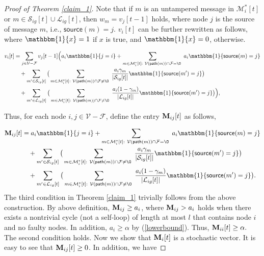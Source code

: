 \documentclass[letterpaper, 11pt]{article}
\newcommand{\calF}{{\mathcal{F}}}
\newcommand{\calL}{{\mathcal{L}}}
\newcommand{\calM}{{\mathcal{M}}}
\newcommand{\calS}{{\mathcal{S}}}
\newcommand{\calV}{{\mathcal{V}}}
\begin{document}
\begin{proof}[Proof of Theorem \ref{claim_1}]
Note that if $m$ is an untampered message in $\calM_i^*[t]$ or
$m\in \calS_{ig}[t]\cup \calL_{ig}[t]$, then $w_m=v_j[t-1]$ holds, where node $j$ is the source of message $m$, i.e., $\mathsf{source}(m)=j$. $v_i[t]$ can be further rewritten as follows, where $\mathbbm{1}\{x\}=1$ if $x$ is true, and $\mathbbm{1}\{x\}=0$, otherwise.


\begin{align*}
v_i[t]&=\sum_{j\in \calV-\calF}v_j[t-1]\Big{(} a_i\mathbbm{1}\{j=i\}+
\sum_{m\in \calM_i^*[t]:~ \calV(\mathsf{path}(m))\cap \calF=\O~}a_i\mathbbm{1}\{\mathsf{source}(m)=j\}\\
&\quad +\sum_{m^{\prime}\in \calS_{ig}[t]}\big{(}\sum_{m\in \calM_i^*[t]:~ \calV(\mathsf{path}(m))\cap \calF\not=\O~}
\frac{a_i\gamma_{m}}{|\calS_{ig}[t]|}\mathbbm{1}\{\mathsf{source}(m^{\prime})=j\}\big{)}\\
&\quad+
\sum_{m^{\prime}\in \calL_{ig}[t]}\big{(}\sum_{m\in \calM_i^*[t]:~\calV(\mathsf{path}(m))\cap \calF\not=\O~}\frac{a_i(1-\gamma_{m})}{|\calL_{ig}[t]|}\mathbbm{1}\{\mathsf{source}(m^{\prime})=j\}\big{)}\Big{)},
\end{align*}



Thus, for each node $i, j\in \calV-\calF$, define the entry ${\bf M}_{ij}[t]$ as follows,

\begin{align*}
      {\bf{M}}_{ij}[t]&=a_i\mathbbm{1}\{j=i\}+
\sum_{m\in \calM_i^*[t]:~ \calV(\mathsf{path}(m))\cap \calF=\O~}a_i\mathbbm{1}\{\mathsf{source}(m)=j\}\\
&\quad +\sum_{m^{\prime}\in \calS_{ig}[t]}\big{(}\sum_{m\in \calM_i^*[t]:~ \calV(\mathsf{path}(m))\cap \calF\not=\O~}
\frac{a_i\gamma_{m}}{|\calS_{ig}[t]|}\mathbbm{1}\{\mathsf{source}(m^{\prime})=j\}\big{)}\\
&\quad+
\sum_{m^{\prime}\in \calL_{ig}[t]}\big{(}\sum_{m\in \calM_i^*[t]:~ \calV(\mathsf{path}(m))\cap \calF\not=\O~}\frac{a_i(1-\gamma_{m})}{|\calL_{ig}[t]|}\mathbbm{1}\{\mathsf{source}(m^{\prime})=j\}\big{)}.
\end{align*}
The third condition in Theorem \ref{claim_1}
trivially follows from the above construction.
 By above definition, ${\bf M}_{ij}\ge a_i$, where ${\bf M}_{ij}> a_i$ holds when there exists a nontrivial cycle (not a self-loop) of length at most $l$ that contains node $i$ and no faulty nodes. In addition, $a_i\ge \alpha$ by (\ref{lowerbound}). Thus, ${\bf M}_{ii}[t]\ge \alpha.$
The second condition holds.
 Now we show that ${\bf{M}}_{i}[t]$ is a stochastic vector. It is easy to see that ${\bf{M}}_{ij}[t]\ge 0$. In addition, we have


\end{proof}
\end{document}
